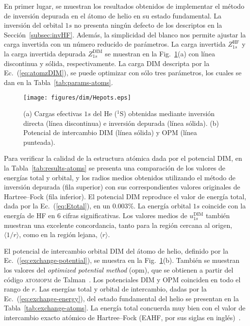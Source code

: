 En primer lugar, se muestran los resultados obtenidos de implementar
el método de inversión depurada en el átomo de helio en su estado
fundamental. La inversión del orbital $1s$ no presenta ningún defecto
de los descriptos en la Sección~\ref{subsec:invHF}. Además, la 
simplicidad del blanco nos permite ajustar la carga invertida con un 
número reducido de parámetros. La carga invertida $Z_{1s}^{\mathrm{HF}}$ 
y la carga invertida depurada $Z_{1s}^{\mathrm{DIM}}$ se muestran en la 
Fig.~\ref{fig:Hepots}(a) con línea discontinua y sólida, 
respectivamente. La carga DIM descripta por la Ec.~(\ref{eq:atomzDIM}), 
se puede optimizar con sólo tres parámetros, los cuales se dan en la 
Tabla~\ref{tab:params-atoms}. 

\begin{figure}[t]
\centering
\texttt{[image: figures/dim/Hepots.eps]}
\caption[Cargas efectivas y potencial de intercambio DIM de He.]
{(a) Cargas efectivas $1s$ del He ($^1$S) obtenidas mediante inversión 
directa (línea discontinua) e inversión depurada (línea sólida). 
(b) Potencial de intercambio DIM (línea sólida) y OPM (línea punteada).}
\label{fig:Hepots}
\end{figure}

Para verificar la calidad de la estructura atómica dada por el potencial 
DIM, en la Tabla~\ref{tab:results-atoms} se presenta una comparación 
de los valores de energías total y orbital, y los radios medios 
obtenidos utilizando el método de inversión depurada (fila superior) con 
sus correspondientes valores originales de Hartree--Fock (fila 
inferior). El potencial DIM reproduce el valor de energía total, dada 
por la Ec.~(\ref{eq:Etotal}), en un $0.003\%$. La energía orbital $1s$ 
coincide con la energía de HF en 6 cifras significativas. Los valores 
medios de $u_{1s}^{\mathrm{DIM}}$ también muestran una excelente 
concordancia, tanto para la región cercana al origen, 
$\langle 1/r\rangle$, como en la región lejana, $\langle r\rangle$.

El potencial de intercambio orbital DIM del átomo de helio, definido por 
la Ec.~(\ref{eq:exchange-potential}), se muestra en la 
Fig.~\ref{fig:Hepots}(b). También se muestran los valores del 
\textit{optimized potential method} (\acs{opm}), que se obtienen a 
partir del código \textsc{atomopm} de Talman~\cite{Talman:76,Talman:89}. 
Los potenciales DIM y OPM coinciden en todo el rango de $r$. Las 
energías total y orbital de intercambio, dadas por la 
Ec.~(\ref{eq:exchange-energy}), del estado fundamental del helio se 
presentan en la Tabla~\ref{tab:exchange-atoms}. La energía total 
concuerda muy bien con el valor de intercambio exacto atómico de 
Hartree--Fock (EAHF, por sus siglas en inglés)~\cite{Becke:88}.

